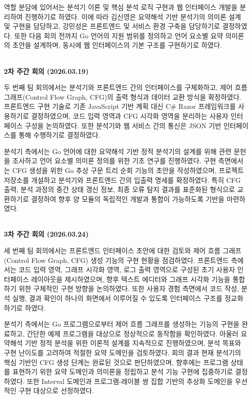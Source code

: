 \documentclass[a4paper,12pt]{article}
\begin{document}
역할 분담에 있어서는 분석기 이론 및 핵심 분석 로직 구현과 웹 인터페이스 개발을 분리하여 진행하기로 하였다. 이에 따라 김신영은 요약해석 기반 분석기의 의미론 설계 및 구현을 담당하고, 강민성은 프론트엔드 및 서비스 환경 구축을 담당하기로 결정하였다. 또한 다음 회의 전까지 Go 언어의 지원 범위를 정의하고 언어 요소별 요약 의미론의 초안을 설계하며, 동시에 웹 인터페이스의 기본 구조를 구현하기로 하였다.

~\\

\textbf{\large 2차 주간 회의 (2026.03.19)}

두 번째 팀 회의에서는 분석기와 프론트엔드 간의 인터페이스를 구체화하고, 제어 흐름 그래프(Control Flow Graph, CFG)의 출력 형식과 데이터 교환 방식을 확정하였다. 프론트엔드 구현 기술로 기존 JavaScript 기반 계획 대신 C\# Razor 프레임워크를 사용하기로 결정하였으며, 코드 입력 영역과 CFG 시각화 영역을 분리하는 사용자 인터페이스 구성을 논의하였다. 또한 분석기와 웹 서비스 간의 통신은 JSON 기반 인터페이스를 통해 수행하기로 결정하였다.

분석기 측에서는 Go 언어에 대한 요약해석 기반 정적 분석기의 설계를 위해 관련 문헌을 조사하고 언어 요소별 의미론 정의를 위한 기초 연구를 진행하였다. 구현 측면에서는 CFG 생성을 위한 Go 추상 구문 트리 순회 기능의 초안을 작성하였으며, 프로젝트 저장소를 개설하고 분석기와 프론트엔드 간의 입출력 명세를 확정하였다. 특히 CFG 출력, 분석 과정의 중간 상태 갱신 정보, 최종 오류 탐지 결과를 표준화된 형식으로 교환하기로 결정하여 향후 양 모듈의 독립적인 개발과 통합이 가능하도록 기반을 마련하였다.

~\\

\textbf{\large 3차 주간 회의 (2026.03.24)}

세 번째 팀 회의에서는 프론트엔드 인터페이스 초안에 대한 검토와 제어 흐름 그래프(Control Flow Graph, CFG) 생성 기능의 구현 현황을 점검하였다. 프론트엔드 측에서는 코드 입력 영역, 그래프 시각화 영역, 로그 출력 영역으로 구성된 초기 사용자 인터페이스 레이아웃을 제시하였으며, 향후 텍스트 에디터와 그래프 시각화 기능을 통합하기 위한 구체적인 구현 방향을 논의하였다. 또한 사용자 경험 측면에서 코드 작성, 분석 실행, 결과 확인이 하나의 화면에서 이루어질 수 있도록 인터페이스 구조를 정교화하기로 하였다.

분석기 측에서는 Go 프로그램으로부터 제어 흐름 그래프를 생성하는 기능의 구현을 완료하고, 간단한 예제 프로그램을 대상으로 정상적으로 동작함을 확인하였다. 아울러 요약해석 기반 정적 분석을 위한 이론적 설계를 지속적으로 진행하였으며, 분석 목표와 구현 난이도를 고려하여 적절한 요약 도메인을 검토하였다. 회의 결과 현재 분석기의 핵심 기반인 CFG 생성 단계는 완료된 것으로 판단하였으며, 향후에는 프로그램 상태를 표현하기 위한 요약 도메인과 의미론을 정립하고 분석 기능 구현에 집중하기로 결정하였다. 또한 Interval 도메인과 프로그램-레이블 쌍 집합 기반의 추상화 도메인을 우선적인 구현 대상으로 선정하였다.
\end{document}
